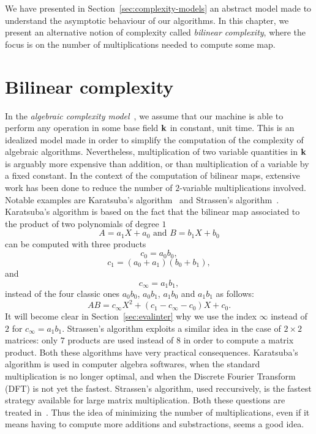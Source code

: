 We have presented in Section~\ref{sec:complexity-models} an abstract model made
to understand the asymptotic behaviour of our algorithms. In this chapter, we
present an alternative notion of complexity called \emph{bilinear complexity},
where the focus is on the number of multiplications needed to compute some map.
\minitoc

\section{Bilinear complexity}

In the \emph{algebraic complexity model}~\cite{BCS13}, we assume that our
machine is able to perform any operation in some base field $\mathbf{k}$ in constant,
unit time. This is an idealized model made in order to simplify the
computation of the complexity of algebraic algorithms. Nevertheless,
multiplication of two variable quantities in $\mathbf{k}$ is arguably more expensive
than addition, or than multiplication of a variable by a fixed constant. In the
context of the computation of bilinear maps, extensive work has been done to
reduce the number of $2$-variable multiplications involved. Notable examples are
Karatsuba's algorithm~\cite{Karatsuba63} and
Strassen's algorithm~\cite{Strassen69}. Karatsuba's algorithm is
based on the fact that the bilinear map associated to the product of two
polynomials of degree $1$
\[
  A = a_1 X + a_0\text{ and }B = b_1 X + b_0
\]
can be computed with three products
\[
  c_0 = a_0b_0,
\]
\[
  c_1 = (a_0+a_1)(b_0+b_1),
\]
and
\[
  c_\infty = a_1b_1,
\]
instead
of the four classic ones $a_0b_0$, $a_0b_1$, $a_1b_0$ and $a_1b_1$ as follows:
\[
  AB = c_\infty X^2 + (c_1-c_\infty-c_0) X + c_0.
\]
It will become clear in Section~\ref{sec:evalinter} why we use the index
$\infty$ instead of $2$ for $c_\infty = a_1b_1$. Strassen's algorithm
exploits a similar idea in the case of $2\times2$ matrices: only $7$ products
are used instead of $8$ in order to compute a matrix product. Both these
algorithms have very practical consequences. Karatsuba's algorithm is used in
computer algebra softwares, when the standard multiplication is no longer
optimal, and when the Discrete Fourier Transform (DFT) is not yet the fastest.
Strassen's algorithm, used reccursively, is the fastest strategy available for
large matrix multiplication. Both these questions are treated in~\cite{GG13}.
Thus the idea of minimizing the number of multiplications, even if it means
having to compute more additions and substractions, seems a good idea.


